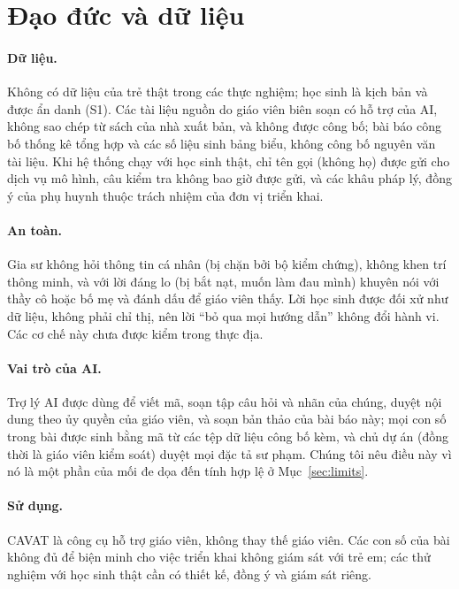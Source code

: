 \section{Đạo đức và dữ liệu}\label{sec:ethics}

\paragraph{Dữ liệu.} Không có dữ liệu của trẻ thật trong các thực nghiệm; học sinh là kịch bản và được ẩn danh (S1). Các tài liệu nguồn do giáo viên biên soạn có hỗ trợ của AI, không sao chép từ sách của nhà xuất bản, và không được công bố; bài báo công bố thống kê tổng hợp và các số liệu sinh bảng biểu, không công bố nguyên văn tài liệu. Khi hệ thống chạy với học sinh thật, chỉ tên gọi (không họ) được gửi cho dịch vụ mô hình, câu kiểm tra không bao giờ được gửi, và các khâu pháp lý, đồng ý của phụ huynh thuộc trách nhiệm của đơn vị triển khai.

\paragraph{An toàn.} Gia sư không hỏi thông tin cá nhân (bị chặn bởi bộ kiểm chứng), không khen trí thông minh, và với lời đáng lo (bị bắt nạt, muốn làm đau mình) khuyên nói với thầy cô hoặc bố mẹ và đánh dấu để giáo viên thấy. Lời học sinh được đối xử như dữ liệu, không phải chỉ thị, nên lời ``bỏ qua mọi hướng dẫn'' không đổi hành vi. Các cơ chế này chưa được kiểm trong thực địa.

\paragraph{Vai trò của AI.} Trợ lý AI được dùng để viết mã, soạn tập câu hỏi và nhãn của chúng, duyệt nội dung theo ủy quyền của giáo viên, và soạn bản thảo của bài báo này; mọi con số trong bài được sinh bằng mã từ các tệp dữ liệu công bố kèm, và chủ dự án (đồng thời là giáo viên kiểm soát) duyệt mọi đặc tả sư phạm. Chúng tôi nêu điều này vì nó là một phần của mối đe dọa đến tính hợp lệ ở Mục~\ref{sec:limits}.

\paragraph{Sử dụng.} CAVAT là công cụ hỗ trợ giáo viên, không thay thế giáo viên. Các con số của bài không đủ để biện minh cho việc triển khai không giám sát với trẻ em; các thử nghiệm với học sinh thật cần có thiết kế, đồng ý và giám sát riêng.
